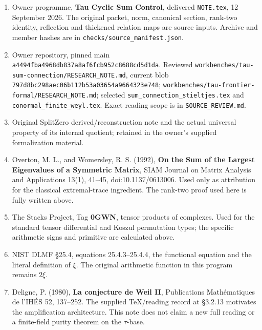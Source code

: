 \documentclass[
  11pt,
]{article}
\providecommand{\tightlist}{%
  \setlength{\itemsep}{0pt}\setlength{\parskip}{0pt}}
\begin{document}
\begin{enumerate}
\def\labelenumi{\arabic{enumi}.}
\tightlist
\item
  Owner programme, \textbf{Tau Cyclic Sum Control}, delivered
  \texttt{NOTE.tex}, 12 September 2026. The original packet, norm,
  canonical section, rank-two identity, reflection and thickened
  relation maps are source inputs. Archive and member hashes are in
  \texttt{checks/source\_manifest.json}.
\item
  Owner repository, pinned main
  \texttt{a4494fba4968db837a8af6fcb952c8688cd5d1da}. Reviewed
  \texttt{workbenches/tau-sum-connection/RESEARCH\_NOTE.md}, current
  blob \texttt{797d8bc298aec06b112b53a03654a9664323e748};
  \texttt{workbenches/tau-frontier-formal/RESEARCH\_NOTE.md}; selected
  \texttt{sum\_connection\_stieltjes.tex} and
  \texttt{conormal\_finite\_weyl.tex}. Exact reading scope is in
  \texttt{SOURCE\_REVIEW.md}.
\item
  Original SplitZero derived/reconstruction note and the actual
  universal property of its internal quotient; retained in the owner's
  supplied formalization material.
\item
  Overton, M. L., and Womersley, R. S. (1992), \textbf{On the Sum of the
  Largest Eigenvalues of a Symmetric Matrix}, SIAM Journal on Matrix
  Analysis and Applications 13(1), 41--45, doi:10.1137/0613006. Used
  only as attribution for the classical extremal-trace ingredient. The
  rank-two proof used here is fully written above.
\item
  The Stacks Project, Tag \textbf{0GWN}, tensor products of complexes.
  Used for the standard tensor differential and Koszul permutation
  types; the specific arithmetic signs and primitive are calculated
  above.
\item
  NIST DLMF §25.4, equations 25.4.3--25.4.4, the functional equation and
  the literal definition of \(\xi\). The original arithmetic function in
  this program remains \(2\xi\).
\item
  Deligne, P. (1980), \textbf{La conjecture de Weil II}, Publications
  Mathématiques de l'IHÉS 52, 137--252. The supplied TeX/reading record
  at §3.2.13 motivates the amplification architecture. This note does
  not claim a new full reading or a finite-field purity theorem on the
  \(\tau\)-base.
\end{enumerate}
\end{document}
